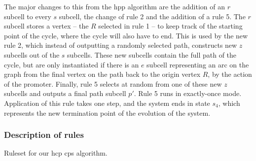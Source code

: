 The major changes to this from the \gls{hpp} algorithm are the addition of an \(r\) subcell to every \(s\) subcell, the change of rule 2 and the addition of a rule 5. The \(r\) subcell stores a vertex -- the \(R\) selected in rule 1 -- to keep track of the starting point of the cycle, where the cycle will also have to end.  This is used by the new rule 2, which instead of outputting a randomly selected path, constructs new \(z\) subcells out of the \(s\) subcells.  These new subcells contain the full path of the cycle, but are only instantiated if there is an \(e\) subcell representing an arc on the graph from the final vertex on the path back to the origin vertex \(R\), by the action of the promoter.  Finally, rule 5 selects at random from one of these new \(z\) subcells and outputs a final path subcell \(p'\).  Rule 5 runs in exactly-once mode.  Application of this rule takes one step, and the system ends in state \(s_4\), which represents the new termination point of the evolution of the system.

\subsubsection{Description of rules}

\begin{cprulesetfloat}
    \begin{cpruleset}
        
        
        
        
        
        
    \end{cpruleset}
    \caption[Ruleset for the ]{\label{ruleset:tsp:hcp}Ruleset for our \gls{hcp} \gls{cps} algorithm.}
\end{cprulesetfloat}

